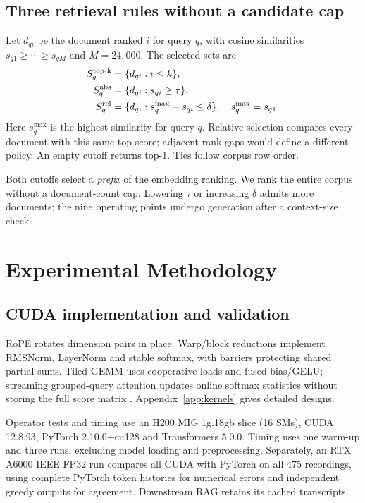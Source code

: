 \documentclass{article}
\begin{document}
\subsection{Three retrieval rules without a candidate cap}
Let $d_{qi}$ be the document ranked $i$ for query $q$, with cosine similarities $s_{q1}\geq\cdots\geq s_{qM}$ and $M=24{,}000$. The selected sets are
\[
\begin{aligned}
S_q^{\rm top\text{-}k}&=\{d_{qi}:i\leq k\},\\
S_q^{\rm abs}&=\{d_{qi}:s_{qi}\geq\tau\},\\
S_q^{\rm rel}&=\{d_{qi}:s_q^{\max}-s_{qi}\leq\delta\},\quad s_q^{\max}=s_{q1}.
\end{aligned}
\]
Here $s_q^{\max}$ is the highest similarity for query $q$. Relative selection compares every document with this same top score; adjacent-rank gaps would define a different policy. An empty cutoff returns top-1. Ties follow corpus row order.

Both cutoffs select a \emph{prefix} of the embedding ranking. We rank the entire corpus without a document-count cap. Lowering $\tau$ or increasing $\delta$ admits more documents; the nine operating points undergo generation after a context-size check.

\clearpage
\section{Experimental Methodology}\label{sec:methodology}
\subsection{CUDA implementation and validation}
RoPE rotates dimension pairs in place. Warp/block reductions implement RMSNorm, LayerNorm and stable softmax, with barriers protecting shared partial sums. Tiled GEMM uses cooperative loads and fused bias/GELU; streaming grouped-query attention updates online softmax statistics without storing the full score matrix \citep{milakov2018,dao2022}. Appendix~\ref{app:kernels} gives detailed designs.

Operator tests and timing use an H200 MIG 1g.18gb slice (16 SMs), CUDA 12.8.93, PyTorch 2.10.0+cu128 and Transformers 5.0.0. Timing uses one warm-up and three runs, excluding model loading and preprocessing. Separately, an RTX A6000 IEEE FP32 run compares all CUDA with PyTorch on all 475 recordings, using complete PyTorch token histories for numerical errors and independent greedy outputs for agreement. Downstream RAG retains its cached transcripts.
\end{document}
